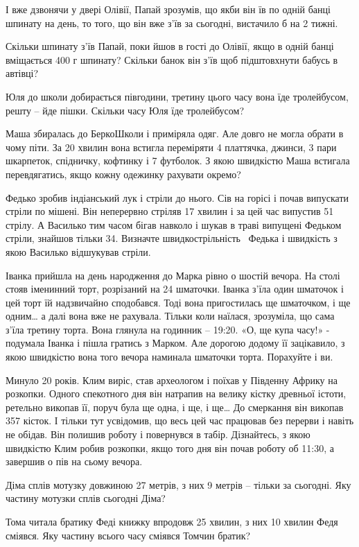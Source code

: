 І вже дзвонячи у двері Олівії, Папай зрозумів, що якби він їв по одній
банці шпинату на день, то того, що він вже з’їв за сьогодні,
вистачило б на 2 тижні.

Скільки шпинату з’їв Папай, поки йшов в гості до Олівії, якщо в одній
банці вміщається 400 г шпинату?
Скільки банок він з’їв щоб підштовхнути бабусь в автівці?


\problem
Юля до школи добирається півгодини,
третину цього часу вона їде тролейбусом, решту – йде пішки.
Скільки часу Юля їде тролейбусом?


\problem
Маша збиралась до БеркоШколи і приміряла одяг.
Але довго не могла обрати в чому піти.
За 20 хвилин вона встигла переміряти 4 платтячка, джинси, 3 пари шкарпеток,
спідничку, кофтинку і 7 футболок.
З якою швидкістю Маша встигала перевдягатись,
якщо кожну одежинку рахувати окремо?


\problem
Федько зробив індіанський лук і стріли до нього.
Сів на горісі і почав випускати стріли по мішені.
Він неперервно стріляв 17 хвилин і за цей час випустив 51 стрілу.
А Василько тим часом бігав навколо і шукав в траві випущені Федьком стріли,
знайшов тільки 34.
Визначте швидкострільність  Федька і швидкість з якою Василько
відшукував стріли.


\problem
Іванка прийшла на день народження до Марка рівно о шостій вечора.
На столі стояв іменинний торт, розрізаний на 24 шматочки.
Іванка з’їла один шматочок і цей торт їй надзвичайно сподобався.
Тоді вона пригостилась ще шматочком, і ще одним… а далі вона вже не рахувала.
Тільки коли наїлася, зрозуміла, що сама з’їла третину торта.
Вона глянула на годинник – 19:20.
«О, ще купа часу!» - подумала Іванка і пішла гратись з Марком.
Але дорогою додому її зацікавило, з якою швидкістю вона того
вечора наминала шматочки торта. Порахуйте і ви.


\problem
Минуло 20 років. Клим виріс, став археологом і поїхав у Південну Африку
на розкопки. Одного спекотного дня він натрапив на велику кістку
древньої істоти, ретельно викопав її, поруч була ще одна, і ще, і ще…
До смеркання він викопав 357 кісток. І тільки тут усвідомив, що весь
цей час працював без перерви і навіть не обідав. Він полишив роботу
і повернувся в табір. Дізнайтесь, з якою швидкістю Клим робив розкопки,
якщо того дня він почав роботу об 11:30, а завершив о пів на сьому вечора.


\problem
Діма сплів мотузку довжиною 27 метрів, з них 9 метрів – тільки за сьогодні.
Яку частину мотузки сплів сьогодні Діма?


\problem
Тома читала братику Феді книжку впродовж 25 хвилин,
з них 10 хвилин Федя сміявся.
Яку частину всього часу сміявся Томчин братик?
